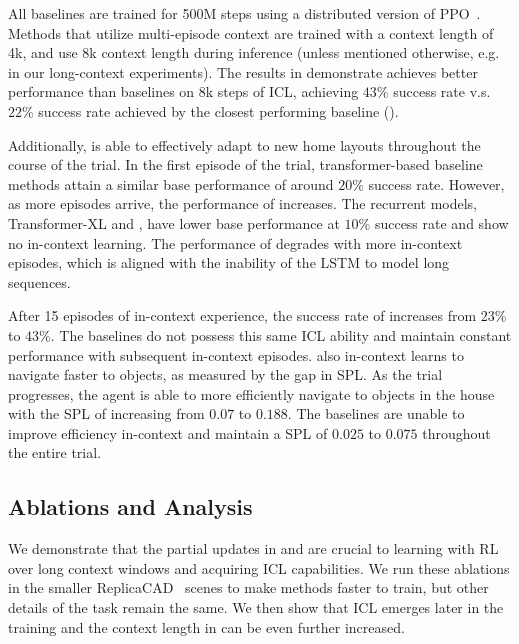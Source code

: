 All baselines are trained for 500M steps using a distributed version of PPO~\citep{wijmans2019dd}. Methods that utilize multi-episode context are trained with a context length of 4k, and use 8k context length during inference (unless mentioned otherwise, e.g. in our long-context experiments). The results in  demonstrate \method achieves better performance than baselines on 8k steps of ICL, achieving $ 43\%$ success rate v.s.  $ 22 \%$ success rate achieved by the closest performing baseline (\semethod).

Additionally, \method is able to effectively adapt to new home layouts throughout the course of the trial. In the first episode of the trial, transformer-based baseline methods attain a similar base performance of around $ 20 \%$ success rate. However, as more episodes arrive, the performance of \method increases. The recurrent models, Transformer-XL and \rls, have lower base performance at $10\%$ success rate and show no in-context learning. 
The performance of \rls degrades with more in-context episodes, which is aligned with the inability of the LSTM to model long sequences.


After 15 episodes of in-context experience, the success rate of \method increases from $ 23\%$ to $ 43\%$.  
The baselines do not possess this same ICL ability and maintain constant performance with subsequent in-context episodes.
\method also in-context learns to navigate faster to objects, as measured by the  gap in SPL.
As the trial progresses, the agent is able to more efficiently navigate to objects in the house with the SPL of \method increasing from $ 0.07$ to $ 0.188$. 
The baselines are unable to improve efficiency in-context and maintain a SPL of $ 0.025$ to $ 0.075$ throughout the entire trial.


\vspace{-5pt}
\subsection{\method Ablations and Analysis}
\label{sec:ablation}
\vspace{-5pt}



We demonstrate that the partial updates in \method and \sinkv are crucial to learning with RL over long context windows and acquiring ICL capabilities. We run these ablations in the smaller ReplicaCAD~\citep{szot2021habitat} scenes to make methods faster to train, but other details of the task remain the same.
We then show that ICL emerges later in the training and the context length in \method can be even further increased.

